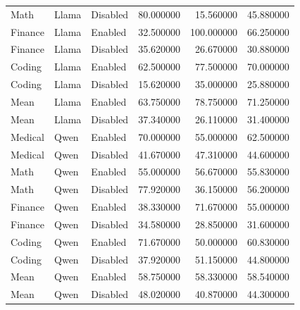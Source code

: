 \begin{tabular}{lllrrr}
Math & Llama & Disabled & 80.000000 & 15.560000 & 45.880000 \\
Finance & Llama & Enabled & 32.500000 & 100.000000 & 66.250000 \\
Finance & Llama & Disabled & 35.620000 & 26.670000 & 30.880000 \\
Coding & Llama & Enabled & 62.500000 & 77.500000 & 70.000000 \\
Coding & Llama & Disabled & 15.620000 & 35.000000 & 25.880000 \\
Mean & Llama & Enabled & 63.750000 & 78.750000 & 71.250000 \\
Mean & Llama & Disabled & 37.340000 & 26.110000 & 31.400000 \\
Medical & Qwen & Enabled & 70.000000 & 55.000000 & 62.500000 \\
Medical & Qwen & Disabled & 41.670000 & 47.310000 & 44.600000 \\
Math & Qwen & Enabled & 55.000000 & 56.670000 & 55.830000 \\
Math & Qwen & Disabled & 77.920000 & 36.150000 & 56.200000 \\
Finance & Qwen & Enabled & 38.330000 & 71.670000 & 55.000000 \\
Finance & Qwen & Disabled & 34.580000 & 28.850000 & 31.600000 \\
Coding & Qwen & Enabled & 71.670000 & 50.000000 & 60.830000 \\
Coding & Qwen & Disabled & 37.920000 & 51.150000 & 44.800000 \\
Mean & Qwen & Enabled & 58.750000 & 58.330000 & 58.540000 \\
Mean & Qwen & Disabled & 48.020000 & 40.870000 & 44.300000 \\
\bottomrule
\end{tabular}
